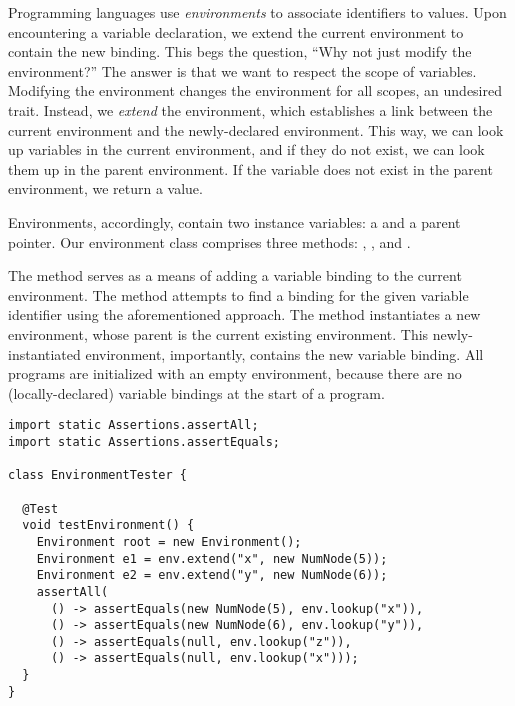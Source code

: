 Programming languages use \emph{environments} to associate identifiers to values. Upon encountering a variable declaration, we extend the current environment to contain the new binding. This begs the question, ``Why not just modify the environment?'' The answer is that we want to respect the scope of variables. Modifying the environment changes the environment for all scopes, an undesired trait. Instead, we \emph{extend} the environment, which establishes a link between the current environment and the newly-declared environment. This way, we can look up variables in the current environment, and if they do not exist, we can look them up in the parent environment. If the variable does not exist in the parent environment, we return a  value.

Environments, accordingly, contain two instance variables: a  and a  parent pointer. Our environment class comprises three methods: , , and . 

The  method serves as a means of adding a variable binding to the current environment. The  method attempts to find a binding for the given variable identifier using the aforementioned approach. The  method instantiates a new environment, whose parent is the current existing environment. This newly-instantiated environment, importantly, contains the new variable binding. All programs are initialized with an empty environment, because there are no (locally-declared) variable bindings at the start of a program.


\begin{lstlisting}[language=MyJava]
import static Assertions.assertAll;
import static Assertions.assertEquals;

class EnvironmentTester {
  
  @Test
  void testEnvironment() {
    Environment root = new Environment();
    Environment e1 = env.extend("x", new NumNode(5));
    Environment e2 = env.extend("y", new NumNode(6));
    assertAll(
      () -> assertEquals(new NumNode(5), env.lookup("x")),
      () -> assertEquals(new NumNode(6), env.lookup("y")),
      () -> assertEquals(null, env.lookup("z")),
      () -> assertEquals(null, env.lookup("x")));
  }
}
\end{lstlisting}

